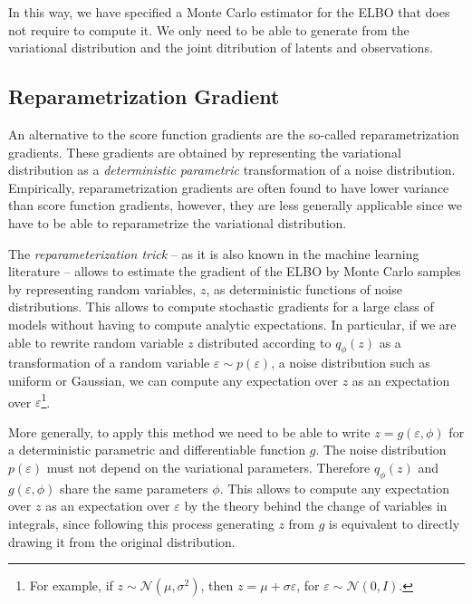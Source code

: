 In this way, we have specified a Monte Carlo estimator for the ELBO that does not require to compute it. We only need to be able to generate from the variational distribution and the joint ditribution of latents and observations.



\subsection{Reparametrization Gradient} \label{sec:reparametrization}
An alternative to the score function gradients are the so-called reparametrization gradients. These gradients are obtained by representing the variational distribution as a \textit{deterministic parametric} transformation of a noise distribution. Empirically, reparametrization gradients are often found to have lower variance than score function gradients, however, they are less generally applicable since we have to be able to reparametrize the variational distribution.

The \textit{reparameterization trick} -- as it is also known in the machine learning literature -- allows to estimate the gradient of the ELBO by Monte Carlo samples by representing random variables, $z$, as deterministic functions of noise distributions. This allows to compute stochastic gradients for a large class of models without having to compute analytic expectations. In particular, if we are able to rewrite random variable $z$ distributed according to $q_\phi(z)$ as a transformation of a random variable $\varepsilon \sim p(\varepsilon)$, a noise distribution such as uniform or Gaussian, we can compute any expectation over $z$ as an expectation over $\varepsilon$\footnote{For example, if $z \sim \mathcal{N}(\mu, \sigma^2)$, then $z = \mu + \sigma\varepsilon$, for $\varepsilon\sim\mathcal{N}(0, I)$.}.

More generally, to apply this method we need to be able to write $z = g(\varepsilon, \phi)$ for a deterministic parametric and differentiable function $g$. The noise distribution $p(\varepsilon)$ must not depend on the variational parameters. Therefore $q_\phi(z)$ and $g(\varepsilon, \phi)$ share the same parameters $\phi$. This allows to compute any expectation over $z$ as an expectation over $\varepsilon$ by the theory behind the change of variables in integrals, since following this process generating $z$ from $g$ is equivalent to directly drawing it from the original distribution.

